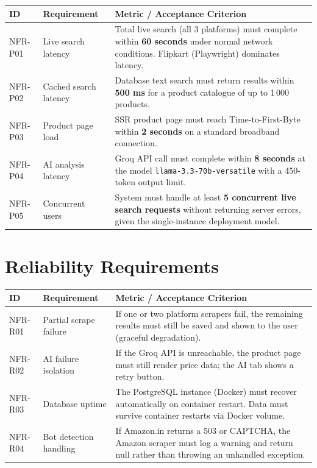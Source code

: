 \documentclass[12pt,a4paper]{report}
\begin{document}
\begin{longtable}{L{2cm} L{4cm} L{7cm}}
  \toprule
  \textbf{ID} & \textbf{Requirement} & \textbf{Metric / Acceptance Criterion} \\
  \midrule
  \endhead
  NFR-P01 & Live search latency &
    Total live search (all 3 platforms) must complete within \textbf{60 seconds}
    under normal network conditions. Flipkart (Playwright) dominates latency. \\[3pt]
  NFR-P02 & Cached search latency &
    Database text search must return results within \textbf{500 ms} for a
    product catalogue of up to 1\,000 products. \\[3pt]
  NFR-P03 & Product page load &
    SSR product page must reach Time-to-First-Byte within \textbf{2 seconds}
    on a standard broadband connection. \\[3pt]
  NFR-P04 & AI analysis latency &
    Groq API call must complete within \textbf{8 seconds} at the model
    \texttt{llama-3.3-70b-versatile} with a 450-token output limit. \\[3pt]
  NFR-P05 & Concurrent users &
    System must handle at least \textbf{5 concurrent live search requests}
    without returning server errors, given the single-instance deployment model. \\
  \bottomrule
\end{longtable}

\section{Reliability Requirements}

\begin{longtable}{L{2cm} L{4cm} L{7cm}}
  \toprule
  \textbf{ID} & \textbf{Requirement} & \textbf{Metric / Acceptance Criterion} \\
  \midrule
  \endhead
  NFR-R01 & Partial scrape failure &
    If one or two platform scrapers fail, the remaining results must still be
    saved and shown to the user (graceful degradation). \\[3pt]
  NFR-R02 & AI failure isolation &
    If the Groq API is unreachable, the product page must still render
    price data; the AI tab shows a retry button. \\[3pt]
  NFR-R03 & Database uptime &
    The PostgreSQL instance (Docker) must recover automatically on container
    restart. Data must survive container restarts via Docker volume. \\[3pt]
  NFR-R04 & Bot detection handling &
    If Amazon.in returns a 503 or CAPTCHA, the Amazon scraper must log a
    warning and return null rather than throwing an unhandled exception. \\
  \bottomrule
\end{longtable}
\end{document}
